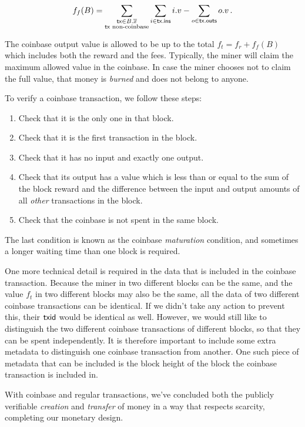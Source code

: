 \[
    f_f(B) = \sum_{\substack{\mathsf{tx} \in B\textsf{.}\overline{x}\\\mathsf{tx} \text{ non-coinbase}}}{\sum_{i \in \mathsf{tx}\textsf{.ins}} i.v - \sum_{o \in \mathsf{tx}\textsf{.outs}} o.v}\,.
\]

The coinbase output value is allowed to be up to the total $f_t = f_r + f_f(B)$ which includes both
the reward and the fees. Typically, the miner will claim the maximum allowed value in the coinbase.
In case the miner chooses not to claim the full value, that money is \emph{burned} and does not belong
to anyone.

To verify a coinbase transaction, we follow these steps:
\begin{enumerate}
    \item Check that it is the only one in that block.
    \item Check that it is the first transaction in the block.
    \item Check that it has no input and exactly one output.
    \item Check that its output has a value which is less than or equal to the sum of the block reward and the difference between the input and output amounts of all \emph{other} transactions in the block.
    \item Check that the coinbase is not spent in the same block.
\end{enumerate}

The last condition is known as the coinbase \emph{maturation} condition,
and sometimes a longer waiting time than one block is required.

One more technical detail is required in the data that is included in the coinbase transaction.
Because the miner in two different blocks can be the same, and the value $f_t$ in two different
blocks may also be the same, all the data of two different coinbase transactions can be identical.
If we didn't take any action to prevent this, their $\mathsf{txid}$ would be identical as well.
However, we would still like to distinguish the two different coinbase transactions of different
blocks, so that they can be spent independently. It is therefore important to include some extra
metadata to distinguish one coinbase transaction from another. One such piece of metadata that
can be included is the block height of the block the coinbase transaction is included in.

With coinbase and regular transactions, we've concluded both the publicly verifiable \emph{creation}
and \emph{transfer} of money in a way that respects scarcity, completing our monetary design.

